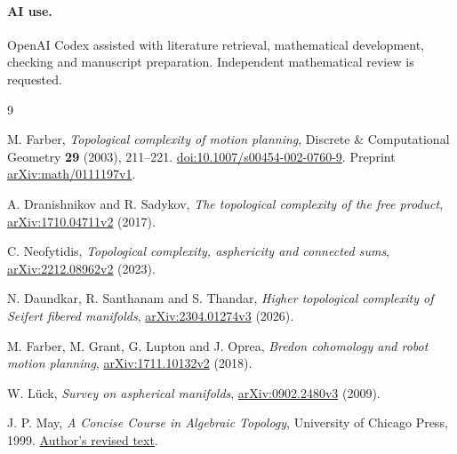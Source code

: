 \documentclass[11pt]{article}
\theoremstyle{remark}
\begin{document}
\paragraph{AI use.}
OpenAI Codex assisted with literature retrieval, mathematical development,
checking and manuscript preparation. Independent mathematical review is
requested.

\begin{thebibliography}{9}

M. Farber, \emph{Topological complexity of motion planning},
Discrete \& Computational Geometry \textbf{29} (2003), 211--221.
\href{https://doi.org/10.1007/s00454-002-0760-9}{doi:10.1007/s00454-002-0760-9}.
Preprint \href{https://arxiv.org/abs/math/0111197v1}{arXiv:math/0111197v1}.

A. Dranishnikov and R. Sadykov,
\emph{The topological complexity of the free product},
\href{https://arxiv.org/abs/1710.04711v2}{arXiv:1710.04711v2} (2017).

C. Neofytidis, \emph{Topological complexity, asphericity and connected sums},
\href{https://arxiv.org/abs/2212.08962v2}{arXiv:2212.08962v2} (2023).

N. Daundkar, R. Santhanam and S. Thandar,
\emph{Higher topological complexity of Seifert fibered manifolds},
\href{https://arxiv.org/abs/2304.01274v3}{arXiv:2304.01274v3} (2026).

M. Farber, M. Grant, G. Lupton and J. Oprea,
\emph{Bredon cohomology and robot motion planning},
\href{https://arxiv.org/abs/1711.10132v2}{arXiv:1711.10132v2} (2018).

W. L\"uck, \emph{Survey on aspherical manifolds},
\href{https://arxiv.org/abs/0902.2480v3}{arXiv:0902.2480v3} (2009).

J. P. May, \emph{A Concise Course in Algebraic Topology},
University of Chicago Press, 1999.
\href{https://www.math.uchicago.edu/~may/CONCISE/ConciseRevised.pdf}{Author's revised text}.

\end{thebibliography}
\end{document}
